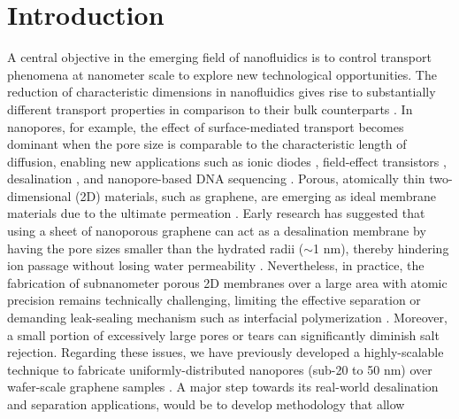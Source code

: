\section{Introduction}
\label{sec:intro}
A central objective in the emerging field of nanofluidics is to
control transport phenomena at nanometer scale to explore new
technological opportunities. The reduction of characteristic
dimensions in nanofluidics gives rise to substantially different
transport properties in comparison to their bulk counterparts
\cite{Schoch_2008_nanofluid}. In nanopores, for example, the effect of
surface-mediated transport becomes dominant when the pore size is
comparable to the characteristic length of diffusion, enabling new
applications such as ionic diodes
\cite{Karnik_2007_nanofluidic,Siwy_2002_fabrication_NPore,Vlassiouk_2007_nanofluidic},
field-effect transistors \cite{Nam_2009_IFET_sub10nm}, desalination
\cite{Heiranian_2015_desali}, and nanopore-based DNA sequencing
\cite{Heerema_2016_gr_np_DNA,Garaj_2013_hugging_gr_pore}. Porous, atomically thin
two-dimensional (2D) materials, such as graphene, are emerging as
ideal membrane materials due to the ultimate permeation
\cite{Suk_2010_water_PG,Jiang_2009_PG_gas,Celebi_2014_science,Koenig_2012,Drahushuk_2012_gas_permeation_gr}.
%
Early research has suggested that using a sheet of nanoporous graphene
can act as a desalination membrane by having the pore sizes smaller
than the hydrated radii ($\sim$1 nm), thereby hindering ion passage
without losing water permeability
\cite{Cohen_Tanugi_2012,Suk_2014_ion_sub_5nm,Cohen_Tanugi_2014_permeab,Cohen_Tanugi_2015_PG,O_Hern_2014_ion,O_Hern_2015_ion_gr,Surwade_2015_desali_npg,Walker_2017_cation_select_2D,Ghosh_2018_PG_ion}.
Nevertheless, in practice, the fabrication of sub\-nanometer porous 2D
membranes over a large area with atomic precision remains technically
challenging, limiting the effective separation or demanding
leak-sealing mechanism such as interfacial polymerization
\cite{Suk_2014_ion_sub_5nm,Rollings_2016_gating,O_Hern_2012_defect,Wang_2017_mechanism_thin_membrane}.
%
Moreover, a small
portion of excessively large pores or tears can significantly diminish
salt rejection. Regarding these issues, we have previously developed a
highly-scalable technique to fabricate uniformly-distributed nanopores
(sub-20 to 50 nm) over wafer-scale graphene samples
\cite{Choi_2018_wafer_scale_gr}. A major step towards its real-world desalination and
separation applications, would be to develop methodology that allow
